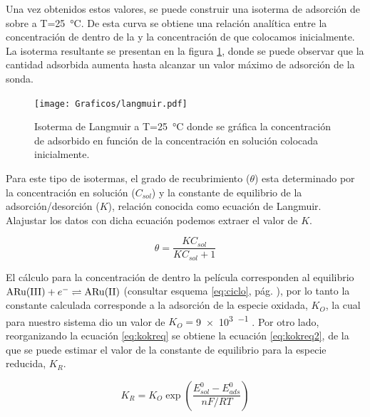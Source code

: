 		
		Una vez obtenidos estos valores, se puede construir una isoterma de adsorción de \ru\space sobre \pdmF\space a T=\SI{25}{\celsius}. De esta curva se obtiene una relación analítica entre la concentración de \ru\space dentro de la \pdm\space y la concentración de \ru\space que colocamos inicialmente. La isoterma resultante se presentan en la figura \ref{fig:langmuir}, donde se puede observar que la cantidad adsorbida aumenta hasta alcanzar un valor máximo de adsorción de la sonda.

			\begin{figure}[h!]
					\centering
			 	    \texttt{[image: Graficos/langmuir.pdf]}
			        \caption[Isoterma de Langmuir]{Isoterma de Langmuir a T=\SI{25}{\celsius} donde se gráfica la concentración de \aminorutenio\space adsorbido en función de la concentración en solución colocada inicialmente.}
			        \label{fig:langmuir}
		      	\end{figure} 


		Para este tipo de isotermas, el grado de recubrimiento ($\theta$) esta determinado por la concentración en solución ($C_{sol}$) y la constante de equilibrio de la adsorción/desorción ($K$), relación conocida como ecuación de Langmuir. Al\space ajustar los datos con dicha ecuación podemos extraer el valor de $K$.

			\begin{equation}
				\theta = \frac{K C_{sol}}{K C_{sol}+1}
				\label{eq:langmuir}
			\end{equation}

		
		El cálculo para la concentración de \ru\space dentro la película corresponden al equilibrio $\text{\ru(III)} + e^- \rightleftharpoons \text{\ru(II)}$ (consultar esquema \ref{eq:ciclo}, pág. \pageref{eq:ciclo}), por lo tanto la constante calculada corresponde a la adsorción de la especie oxidada, $K_O$, la cual para nuestro sistema dio un valor de $K_O=$\SI{9e3}{\Molar^{-1}} . Por otro lado, reorganizando la ecuación \ref{eq:kokreq} se obtiene la ecuación \ref{eq:kokreq2}, de la que se puede estimar el valor de la constante de equilibrio para la especie reducida, $K_R$. 
	
		\begin{equation}
				K_R=K_O \exp\left({\frac{E^0_{sol}-E^0_{ads}}{nF/RT}}\right)
				\label{eq:kokreq2}
		\end{equation}

